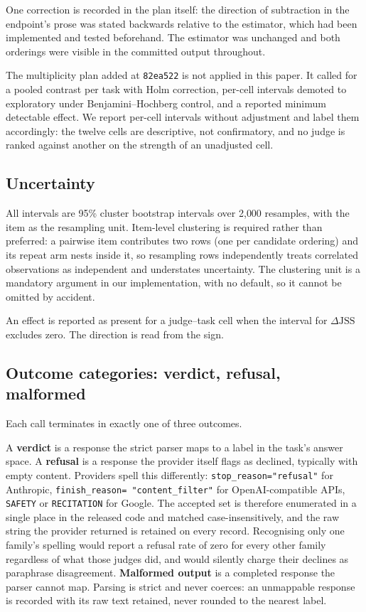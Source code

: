 One correction is recorded in the plan itself: the direction of subtraction in
the endpoint's prose was stated backwards relative to the estimator, which had
been implemented and tested beforehand. The estimator was unchanged and both
orderings were visible in the committed output throughout.

The multiplicity plan added at \texttt{82ea522} is not applied in this paper. It
called for a pooled contrast per task with Holm correction, per-cell intervals
demoted to exploratory under Benjamini--Hochberg control, and a reported minimum
detectable effect. We report per-cell intervals without adjustment and label
them accordingly: the twelve cells are descriptive, not confirmatory, and no
judge is ranked against another on the strength of an unadjusted cell.

\subsection{Uncertainty}

All intervals are 95\% cluster bootstrap intervals over 2{,}000 resamples, with
the item as the resampling unit. Item-level clustering is required rather than
preferred: a pairwise item contributes two rows (one per candidate ordering) and
its repeat arm nests inside it, so resampling rows independently treats
correlated observations as independent and understates uncertainty. The
clustering unit is a mandatory argument in our implementation, with no default,
so it cannot be omitted by accident.

An effect is reported as present for a judge--task cell when the interval for
$\Delta\mathrm{JSS}$ excludes zero. The direction is read from the sign.

\subsection{Outcome categories: verdict, refusal, malformed}
\label{sec:refusal}

Each call terminates in exactly one of three outcomes.

A \textbf{verdict} is a response the strict parser maps to a label in the task's
answer space. A \textbf{refusal} is a response the provider itself flags as
declined, typically with empty content. Providers spell this differently:
\texttt{stop\_reason="refusal"} for Anthropic, \texttt{finish\_reason=
"content\_filter"} for OpenAI-compatible APIs, \texttt{SAFETY} or
\texttt{RECITATION} for Google. The accepted set is therefore enumerated in a
single place in the released code and matched case-insensitively, and the raw string the
provider returned is retained on every record. Recognising only one family's
spelling would report a refusal rate of zero for every other family regardless of
what those judges did, and would silently charge their declines as paraphrase
disagreement.
\textbf{Malformed output} is a completed response the parser cannot map. Parsing
is strict and never coerces: an unmappable response is recorded with its raw text
retained, never rounded to the nearest label.

